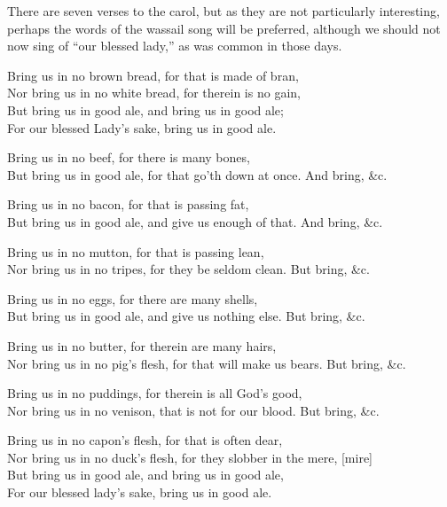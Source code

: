 There are seven verses to the carol, but as they are not particularly interesting,
perhaps the words of the wassail song will be preferred, although we should not
now sing of “our blessed lady,” as was common in those days.
\settowidth{\versewidth}{Bring us in no brown bread, for that is made of bran,}
\begin{scverse}
Bring us in no brown bread, for that is made of bran,\\
Nor bring us in no white bread, for therein is no gain,\\
\hspace{\vgap}But bring us in good ale, and bring us in good ale;\\
\hspace{\vgap}For our blessed Lady’s sake, bring us in good ale.

Bring us in no beef, for there is many bones,\\
But bring us in good ale, for that go’th down at once. And bring, \&c.

Bring us in no bacon, for that is passing fat,\\
But bring us in good ale, and give us enough of that. And bring, \&c.

Bring us in no mutton, for that is passing lean,\\
Nor bring us in no tripes, for they be seldom clean. But bring, \&c.

Bring us in no eggs, for there are many shells,\\
But bring us in good ale, and give us nothing else. But bring, \&c.

Bring us in no butter, for therein are many hairs,\\
Nor bring us in no pig’s flesh, for that will make us bears. But bring, \&c.

Bring us in no puddings, for therein is all God’s good,\\
Nor bring us in no venison, that is not for our blood. But bring, \&c.

Bring us in no capon’s flesh, for that is often dear,\\
Nor bring us in no duck’s flesh, for they slobber in the mere, [mire]\\
\hspace{\vgap}But bring us in good ale, and bring us in good ale,\\
\hspace{\vgap}For our blessed lady’s sake, bring us in good ale.
\end{scverse}

